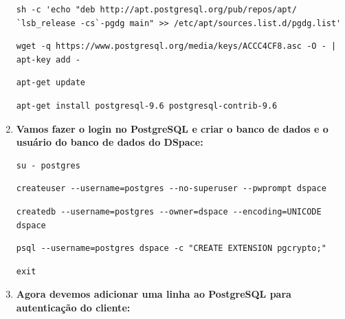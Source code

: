 \documentclass[12pt,hidelinks]{article}
\begin{document}
\begin{enumerate}
        \begin{verbatim}
sh -c 'echo "deb http://apt.postgresql.org/pub/repos/apt/ 
`lsb_release -cs`-pgdg main" >> /etc/apt/sources.list.d/pgdg.list'
        \end{verbatim}

       \begin{verbatim}
wget -q https://www.postgresql.org/media/keys/ACCC4CF8.asc -O - | apt-key add -
       \end{verbatim}
      
       \begin{verbatim}
apt-get update
       \end{verbatim}
            
        \begin{verbatim}
apt-get install postgresql-9.6 postgresql-contrib-9.6
       \end{verbatim}


        \item \textbf{Vamos fazer o login no PostgreSQL e criar o banco de dados e o usuário do banco de dados do DSpace:}\\
        
            \begin{verbatim}
su - postgres
            \end{verbatim}
            
            \begin{verbatim}
createuser --username=postgres --no-superuser --pwprompt dspace
            \end{verbatim}
            
            \begin{verbatim}
createdb --username=postgres --owner=dspace --encoding=UNICODE dspace
            \end{verbatim}
            
            \begin{verbatim}
psql --username=postgres dspace -c "CREATE EXTENSION pgcrypto;"
            \end{verbatim}
            
             \begin{verbatim}
exit
            \end{verbatim}
            
        \item \textbf{Agora devemos adicionar uma linha ao PostgreSQL para autenticação do cliente:}\\
    

\end{enumerate}
\end{document}
